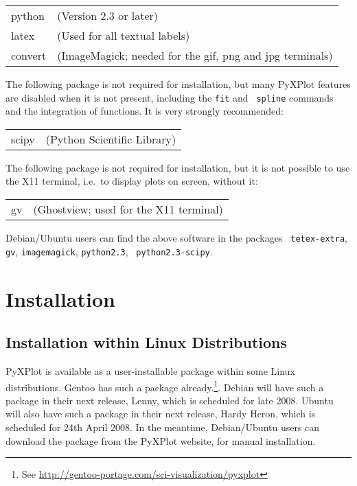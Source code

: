 \vspace{0.5cm}
\begin{tabular}{ll}
python  & (Version 2.3 or later)\index{python} \\
latex   & (Used for all textual labels) \\
convert & (ImageMagick; needed for the gif, png and jpg terminals)\index{ImageMagick} \\
\end{tabular}
\vspace{0.5cm}

The following package is not required for installation, but many PyXPlot
features are disabled when it is not present, including the {\tt fit} and {\tt
spline} commands and the integration of functions. It is very strongly
recommended:

\vspace{0.5cm}
\begin{tabular}{ll} 
scipy   & (Python Scientific Library)\index{scipy} \\
\end{tabular}
\vspace{0.5cm}

The following package is not required for installation, but it is not possible
to use the X11 terminal, i.e.\ to display plots on screen, without it:

\vspace{0.5cm}
\begin{tabular}{ll}
gv      & (Ghostview; used for the X11 terminal)\index{Ghostview} \\
\end{tabular}
\vspace{0.5cm}

Debian/Ubuntu users can find the above software in the packages {\tt
tetex-extra}, {\tt gv}, {\tt imagemagick}, {\tt python2.3}, {\tt
python2.3-scipy}.

\section{Installation}

\subsection{Installation within Linux Distributions}

PyXPlot is available as a user-installable package within some Linux
distributions. Gentoo has such a package already.\footnote{See
\url{http://gentoo-portage.com/sci-visualization/pyxplot}}. Debian will have
such a package in their next release, Lenny, which is scheduled for late 2008.
Ubuntu will also have such a package in their next release, Hardy Heron, which
is scheduled for 24th April 2008. In the meantime, Debian/Ubuntu users can
download the package from the PyXPlot website, for manual installation.

